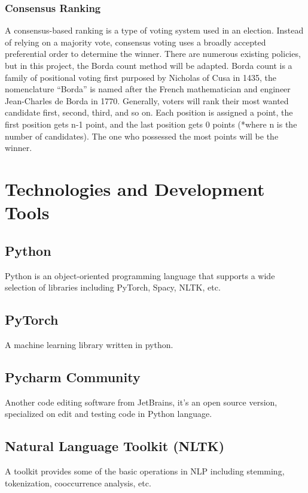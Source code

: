 \documentclass[12pt,oneside,openright,a4paper]{cpe-english-project}
\begin{document}
\subsubsection{Consensus Ranking}
A consensus-based ranking is a type of voting system used in an election. Instead of relying on a majority vote, consensus voting uses a broadly accepted preferential order to determine the winner\cite{y}. There are numerous existing policies, but in this project, the Borda count method will be adapted. Borda count is a family of positional voting first purposed by Nicholas of Cusa in 1435, the nomenclature “Borda” is named after the French mathematician and engineer Jean-Charles de Borda in 1770. Generally, voters will rank their most wanted candidate first, second, third, and so on. Each position is assigned a point, the first position gets n-1 point, and the last position gets 0 points (*where n is the number of candidates). The one who possessed the most points will be the winner.



\section{Technologies and Development Tools}
\subsection{Python} 
Python is an object-oriented programming language that supports a wide selection of libraries including PyTorch, Spacy, NLTK, etc. 
 
\subsection{PyTorch} 
A machine learning library written in python.

\subsection{Pycharm Community} 
Another code editing software from JetBrains, it’s an open source version, specialized on edit and testing code in Python language. 

\subsection{Natural Language Toolkit (NLTK)} 
A toolkit provides some of the basic operations in NLP including stemming, tokenization, cooccurrence analysis, etc. 
\end{document}
